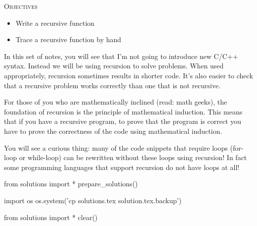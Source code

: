 
\textsc{Objectives}
\begin{itemize}
\item Write a recursive function
\item Trace a recursive function by hand
\end{itemize}

In this set of notes, you will see that I'm not going to introduce new
C/C++ syntax. Instead we will be using recursion to solve problems. When
used appropriately, recursion sometimes results in shorter code.
It's also easier to check that a recursive problem works
correctly than one that is not recursive.

For those of you who are mathematically inclined (read: math geeks), the
foundation of recursion is the principle of mathematical induction. This
means that if you have a recursive program, to prove that the program is
correct you have to prove the correctness of the code using mathematical
induction.

You will see a curious thing: many of the code snippets that require
loops (for-loop or while-loop) can be rewritten without these loops
using recursion! In fact some programming languages that support
recursion do not have loops at all!














\begin{python0}
from solutions import *
prepare_solutions()
\end{python0}
\begin{python}
import os
os.system('cp solutions.tex solution.tex.backup')  
\end{python}

\begin{python0}
from solutions import *
clear()
\end{python0}
